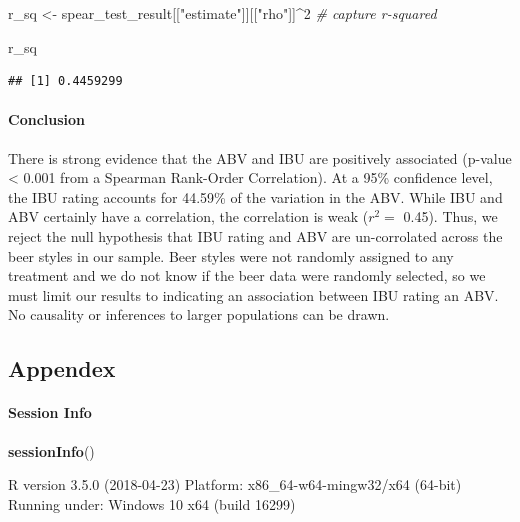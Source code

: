 \documentclass[]{article}
\newenvironment{Shaded}{\begin{snugshade}}{\end{snugshade}}
\newcommand{\KeywordTok}[1]{\textcolor[rgb]{0.13,0.29,0.53}{\textbf{#1}}}
\newcommand{\DecValTok}[1]{\textcolor[rgb]{0.00,0.00,0.81}{#1}}
\newcommand{\StringTok}[1]{\textcolor[rgb]{0.31,0.60,0.02}{#1}}
\newcommand{\CommentTok}[1]{\textcolor[rgb]{0.56,0.35,0.01}{\textit{#1}}}
\newcommand{\OperatorTok}[1]{\textcolor[rgb]{0.81,0.36,0.00}{\textbf{#1}}}
\newcommand{\NormalTok}[1]{#1}
\let\oldparagraph\paragraph
\renewcommand{\paragraph}[1]{\oldparagraph{#1}\mbox{}}
\begin{document}
\begin{Shaded}
\begin{Highlighting}[]
\NormalTok{r_sq <-}\StringTok{ }\NormalTok{spear_test_result[[}\StringTok{"estimate"}\NormalTok{]][[}\StringTok{"rho"}\NormalTok{]]}\OperatorTok{^}\DecValTok{2} \CommentTok{# capture r-squared}

\NormalTok{r_sq}
\end{Highlighting}
\end{Shaded}

\begin{verbatim}
## [1] 0.4459299
\end{verbatim}

\paragraph{Conclusion}\label{conclusion}

There is strong evidence that the ABV and IBU are positively associated
(p-value \textless{} 0.001 from a Spearman Rank-Order Correlation). At a
95\% confidence level, the IBU rating accounts for 44.59\% of the
variation in the ABV. While IBU and ABV certainly have a correlation,
the correlation is weak (\(r^2 =\) 0.45). Thus, we reject the null
hypothesis that IBU rating and ABV are un-corrolated across the beer
styles in our sample. Beer styles were not randomly assigned to any
treatment and we do not know if the beer data were randomly selected, so
we must limit our results to indicating an association between IBU
rating an ABV. No causality or inferences to larger populations can be
drawn.

\subsection{Appendex}\label{appendex}

\paragraph{Session Info}\label{session-info}

\begin{Shaded}
\begin{Highlighting}[]
\KeywordTok{sessionInfo}\NormalTok{()}
\end{Highlighting}
\end{Shaded}

R version 3.5.0 (2018-04-23) Platform: x86\_64-w64-mingw32/x64 (64-bit)
Running under: Windows 10 x64 (build 16299)
\end{document}
